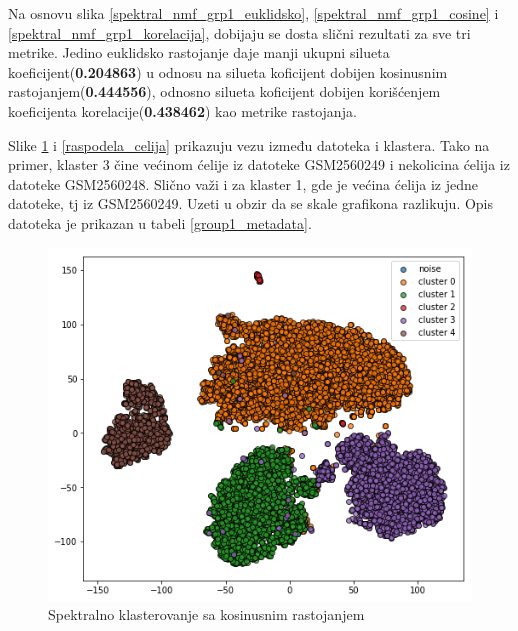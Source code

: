 \documentclass[a4paper]{article}
\begin{document}
Na osnovu slika \ref{spektral_nmf_grp1_euklidsko}, \ref{spektral_nmf_grp1_cosine} i \ref{spektral_nmf_grp1_korelacija}, dobijaju se dosta slični rezultati za sve tri metrike. Jedino euklidsko rastojanje daje manji ukupni silueta koeficijent(\textbf{0.204863}) u odnosu na silueta koficijent dobijen kosinusnim rastojanjem(\textbf{0.444556}), odnosno silueta koficijent dobijen korišćenjem koeficijenta korelacije(\textbf{0.438462}) kao metrike rastojanja.

Slike \ref{spektral_nmf_grp1_cosine_bar} i \ref{raspodela_celija} prikazuju vezu između datoteka i klastera. Tako na primer, klaster 3 čine većinom ćelije iz datoteke GSM2560249 i nekolicina ćelija iz datoteke GSM2560248. Slično važi i za klaster 1, gde je većina ćelija iz jedne datoteke, tj iz GSM2560249. Uzeti u obzir da se skale grafikona razlikuju. Opis datoteka je prikazan u tabeli \ref{group1_metadata}.

\begin{figure}[H]
	\centering
	\includegraphics[scale=0.4]{spektral_nmf_grp1_cosine_bar}
	\caption{Spektralno klasterovanje sa kosinusnim rastojanjem}
	\label{spektral_nmf_grp1_cosine_bar}
\end{figure}
\end{document}
